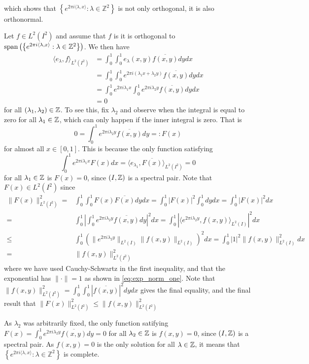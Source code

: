 \documentclass[../thesis.tex]{subfiles}
\begin{document}
which shows that $\left\{ e^{2\pi i \langle \lambda,x  \rangle } : \lambda \in \mathbb{Z}^2\right\}$ is not only orthogonal, it is also orthonormal.


Let $f\in L^2(I^2)$ and assume that $f$ is it is orthogonal to $\operatorname{span}\left( \left\{ e^{2\pi i \langle \lambda,x  \rangle} : \lambda \in \mathbb{Z}^2\right\} \right)$. We then have
\begin{align*}
    \langle e_\lambda, f \rangle_{L^2(I^2)} &= \int_0^1 \int_0^1 e_\lambda(x,y) \overline{f(x,y)} dydx \\   
    &= \int_0^1 \int_0^1 e^{2\pi i  (\lambda_1x + \lambda_2 y)} \overline{f(x,y)} dydx \\
    &= \int_0^1 e^{2 \pi i \lambda_1 x}\int_0^1 e^{2 \pi i \lambda_2 y} \overline{f(x,y)} dydx \\
    &= 0
\end{align*}
for all $\left(\lambda_1,\lambda_2\right) \in \mathbb{Z}$. To see this, fix $\lambda_2$ and observe when the integral is equal to zero for all $\lambda_1\in \mathbb{Z}$, which can only happen if the inner integral is zero. That is 
\begin{equation*}
    0=\int_0^1 e^{2 \pi i \lambda_2 y} \overline{f(x,y)} dy  =: F(x)
\end{equation*}
for almost all $x\in[0,1]$. This is because the only function satisfying 
\begin{equation*}
    \int_0^1 e^{2 \pi i \lambda_1 x} F(x)dx = \langle e_{\lambda_1}, \overline{F(x)}\rangle_{L^2(I^2)} = 0
\end{equation*}
for all $\lambda_1 \in \mathbb{Z}$ is $F(x)=0$, since $\left(I,\mathbb{Z}\right)$ is a spectral pair. Note that $F(x)\in L^2(I^2)$ since
\begin{align*}
    \|F(x)\|_{L^2(I^2)}^2 =&  \int_0^1 \int_0^1 F(x) \overline{F(x)} dydx
    = \int_0^1 | F(x)|^2 \int_0^1 dy dx = \int_0^1 | F(x)|^2 dx \\
    =& \int_0^1 \left| \int_0^1 e^{2 \pi i \lambda_2 y} \overline{f(x,y)} dy \right|^2 dx 
    = \int_0^1 \left| \langle e^{2 \pi i \lambda_2 y} , f(x,y) \rangle_{L^2(I)} \right|^2 dx\\
    \leq & \int_0^1 \left( \|e^{2 \pi i \lambda_2 y} \|_{L^2(I)} \|f(x,y) \|_{L^2(I)} \right)^2dx
    = \int_0^1 | 1|^2 \|f(x,y) \|_{L^2(I)}^2 dx \\
    = & \|f(x,y) \|_{L^2(I^2)}^2
\end{align*}
where we have used Cauchy-Schwartz in the first inequality, and that the exponential has $\|\cdot\| = 1$ as shown in \cref{eq:exp_norm_one}. Note that $\|f(x,y) \|_{L^2(I^2)}^2 =\int_0^1 \int_0^1 |\overline{f(x,y)}|^2 dy dx$ gives the final equality, and the final result that $\|F(x)\|_{L^2(I^2)}^2 \leq \|f(x,y) \|_{L^2(I^2)}^2$

As $\lambda_2$ was arbitrarily fixed, the only function satifying $F(x) = \int_0^1 e^{2 \pi i \lambda_2 y} \overline{f(x,y)} dy = 0 $ for all $\lambda_2 \in \mathbb{Z}$ is $f(x,y)=0$, since $\left(I,\mathbb{Z}\right)$ is a spectral pair. As $f(x,y)=0$ is the only solution for all $\lambda \in \mathbb{Z}$, it means that $\left\{ e^{2\pi i \langle \lambda,x  \rangle } : \lambda \in \mathbb{Z}^2\right\}$ is complete. 
\end{document}
